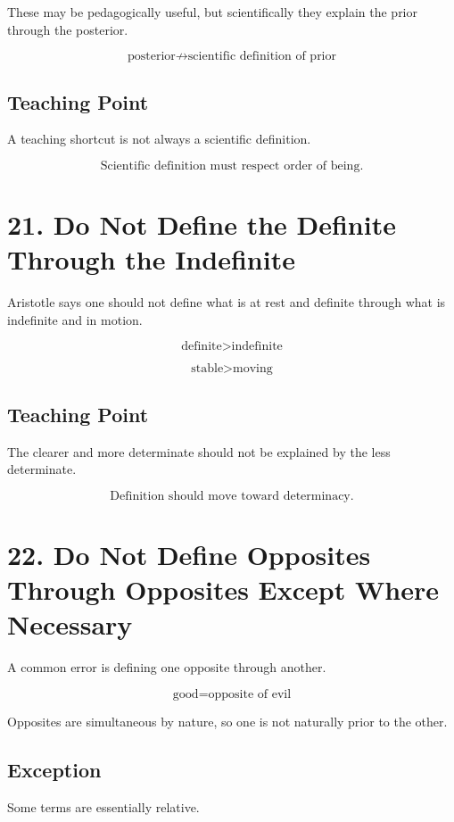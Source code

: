 \documentclass[12pt]{article}
\begin{document}
These may be pedagogically useful, but scientifically they explain the prior
through the posterior.

\[
\text{posterior} \not\rightarrow \text{scientific definition of prior}
\]

\subsection*{Teaching Point}

A teaching shortcut is not always a scientific definition.

\[
\boxed{
\text{Scientific definition must respect order of being.}
}
\]

\section*{21. Do Not Define the Definite Through the Indefinite}

Aristotle says one should not define what is at rest and definite through what
is indefinite and in motion.

\[
\text{definite} > \text{indefinite}
\]

\[
\text{stable} > \text{moving}
\]

\subsection*{Teaching Point}

The clearer and more determinate should not be explained by the less
determinate.

\[
\boxed{
\text{Definition should move toward determinacy.}
}
\]

\section*{22. Do Not Define Opposites Through Opposites Except Where Necessary}

A common error is defining one opposite through another.

\[
\text{good} = \text{opposite of evil}
\]

Opposites are simultaneous by nature, so one is not naturally prior to the
other.

\subsection*{Exception}

Some terms are essentially relative.
\end{document}
